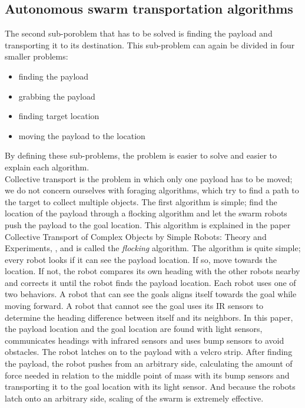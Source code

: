 \subsection{Autonomous swarm transportation algorithms}
The second sub-poroblem that has to be solved is finding the payload and transporting it to its destination.
This sub-problem can again be divided in four smaller problems:

\begin{itemize}
	\item finding the payload
	\item grabbing the payload
	\item finding target location
	\item moving the payload to the location
\end{itemize}

By defining these sub-problems, the problem is easier to solve and easier to explain each algorithm. \\

Collective transport is the problem in which only one payload has to be moved; we do not concern ourselves with foraging algorithms, which try to find a path to the target to collect multiple objects.
The first algorithm is simple; find the location of the payload through a flocking algorithm and let the swarm robots push the payload to the goal location. 
This algorithm is explained in the paper Collective Transport of Complex Objects by Simple Robots: Theory and Experiments, \cite{Rubenstein2013collecive}, and is called the \emph{flocking} algorithm.
The algorithm is quite simple; every robot looks if it can see the payload location. If so, move towards the location. If not, the robot compares its own heading with the other robots nearby and corrects it until the robot finds the payload location.
Each robot uses one of two behaviors.
 A robot that can see the goals aligns itself towards the goal while moving forward.
 A robot that cannot see the goal uses its IR sensors to determine the heading difference between itself and its neighbors.
 In this paper, the payload location and the goal location are found with light sensors, communicates headings with infrared sensors and uses bump sensors to avoid obstacles. 
The robot latches on to the payload with a velcro strip.
After finding the payload, the robot pushes from an arbitrary side, calculating the amount of force needed in relation to the middle point of mass with its bump sensors and transporting it to the goal location with its light sensor.  
And because the robots latch onto an arbitrary side, scaling of the swarm is extremely effective. \\ 

